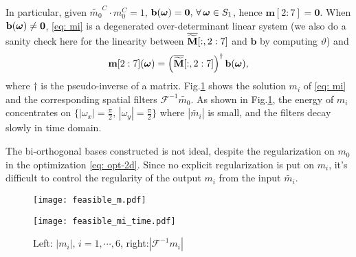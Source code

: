 In particular, given $\widetilde{m_0}^C \cdot m_0^C = 1$, $\mathbf{b}(\boldsymbol{\omega}) = \mathbf{0}, \, \forall\,\boldsymbol{\omega}\in S_1$, hence $\mathbf{m}[2:7] = \mathbf{0}$. 
When $\mathbf{b}(\boldsymbol{\omega})\neq \mathbf{0}$, \eqref{eq: mi} is a degenerated over-determinant linear system (we also do a sanity check here for the linearity between $\overline{\widetilde{\mathbf{M}}}[:,2:7]$ and $\mathbf{b}$ by computing $\vartheta$) and 
$$\mathbf{m}[2:7](\boldsymbol{\omega}) = \Big(\overline{\widetilde{\mathbf{M}}}[:,2:7]\Big)^\dagger\,\mathbf{b}(\boldsymbol{\omega}),$$
where $\dagger$ is the pseudo-inverse of a matrix. Fig.\ref{fig: m_i} shows the solution $m_i$ of \eqref{eq: mi} and the corresponding spatial filters $\mathcal{F}^{-1}\widetilde{m_0}$.
As shown in Fig.\ref{fig: m_i}, the energy of $m_i$ concentrates on $\{|\omega_x| = \frac{\pi}{2},\, |\omega_y| = \frac{\pi}{2}\}$ where $|\widetilde{m_i}|$ is small, and the filters decay slowly in time domain.

The bi-orthogonal bases constructed is not ideal, despite the regularization on $m_0$ in the optimization \eqref{eq: opt-2d}. Since no explicit regularization is put on $m_i$, it's difficult to control the regularity of the output $m_i$ from the input $\widetilde{m_i}$.

\begin{figure}
\centering
\begin{minipage}[c]{.5\textwidth}
\texttt{[image: feasible\_m.pdf]}
\end{minipage}
\begin{minipage}[c]{.48\textwidth}
\texttt{[image: feasible\_mi\_time.pdf]}
\end{minipage}
\caption{Left: $|m_i|,\, i = 1,\cdots,6$, right:$|\mathcal{F}^{-1}m_i|$}
\label{fig: m_i}
\end{figure}